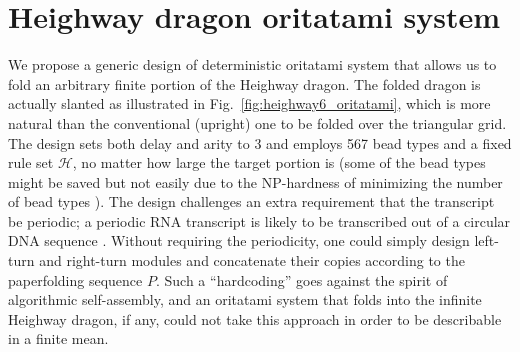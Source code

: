 	\section{Heighway dragon oritatami system}



We propose a generic design of deterministic oritatami system that allows us to fold an arbitrary finite portion of the Heighway dragon. 
The folded dragon is actually slanted as illustrated in Fig.~\ref{fig:heighway6_oritatami}, which is more natural than the conventional (upright) one to be folded over the triangular grid. 
The design sets both delay and arity to 3 and employs 567 bead types and a fixed rule set $\mathcal{H}$, no matter how large the target portion is (some of the bead types might be saved but not easily due to the NP-hardness of minimizing the number of bead types \cite{HanKim2017}). 
The design challenges an extra requirement that the transcript be periodic; a periodic RNA transcript is likely to be transcribed out of a circular DNA sequence \cite{GearyAndersen2014}. 
Without requiring the periodicity, one could simply design left-turn and right-turn modules and concatenate their copies according to the paperfolding sequence $P$. 
Such a ``hardcoding'' goes against the spirit of algorithmic self-assembly, and an oritatami system that folds into the infinite Heighway dragon, if any, could not take this approach in order to be describable in a finite mean. 



